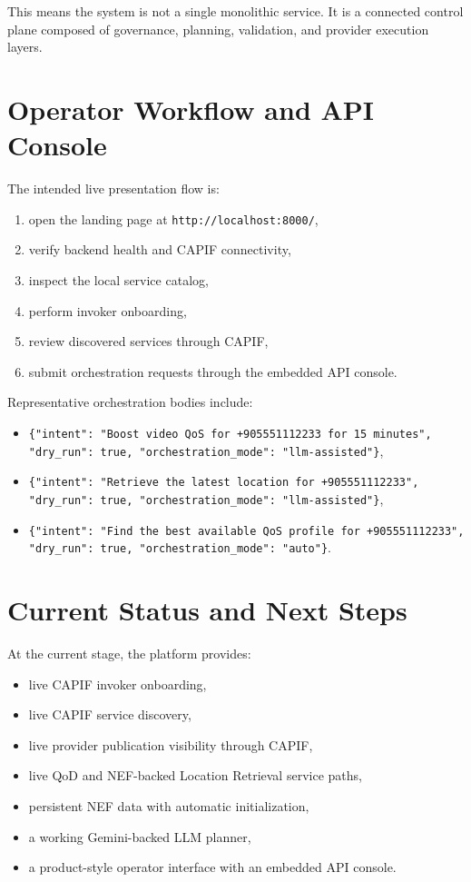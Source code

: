 \documentclass[conference]{IEEEtran}
\begin{document}
This means the system is not a single monolithic service. It is a connected control plane composed of governance, planning, validation, and provider execution layers.

\section{Operator Workflow and API Console}

The intended live presentation flow is:

\begin{enumerate}[leftmargin=1.1em]
\item open the landing page at \texttt{http://localhost:8000/},
\item verify backend health and CAPIF connectivity,
\item inspect the local service catalog,
\item perform invoker onboarding,
\item review discovered services through CAPIF,
\item submit orchestration requests through the embedded API console.
\end{enumerate}

Representative orchestration bodies include:

\begin{itemize}[leftmargin=1.1em]
\item \texttt{\{"intent": "Boost video QoS for +905551112233 for 15 minutes", "dry\_run": true, "orchestration\_mode": "llm-assisted"\}},
\item \texttt{\{"intent": "Retrieve the latest location for +905551112233", "dry\_run": true, "orchestration\_mode": "llm-assisted"\}},
\item \texttt{\{"intent": "Find the best available QoS profile for +905551112233", "dry\_run": true, "orchestration\_mode": "auto"\}}.
\end{itemize}

\section{Current Status and Next Steps}

At the current stage, the platform provides:

\begin{itemize}[leftmargin=1.1em]
\item live CAPIF invoker onboarding,
\item live CAPIF service discovery,
\item live provider publication visibility through CAPIF,
\item live QoD and NEF-backed Location Retrieval service paths,
\item persistent NEF data with automatic initialization,
\item a working Gemini-backed LLM planner,
\item a product-style operator interface with an embedded API console.
\end{itemize}
\end{document}
